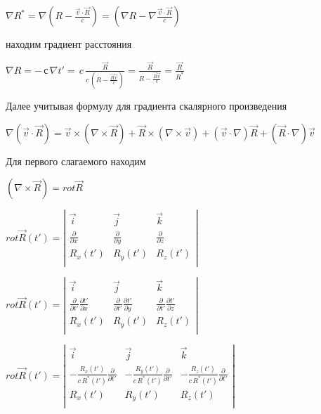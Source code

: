 \documentclass[11pt]{article}
\begin{document}
\(\nabla {{R}^{*}} = \nabla {\left( R-\frac{\overrightarrow{v}\cdot \overrightarrow{R}}{c} \right)} = {\left( \nabla R-\nabla \frac{\overrightarrow{v}\cdot \overrightarrow{R}}{c} \right)}\)

    находим градиент расстояния

\(\nabla R = -\,с \,\nabla t' = \,c\,\frac{\vec R}{c\,\left(R -\frac{\vec R\vec v}{c}\right)} = \frac{\vec R}{R -\frac{\vec R\vec v}{c}}=\frac{\vec R}{{R}^{*}}\)

    Далее учитывая формулу для градиента скалярного произведения

\(\nabla \left(\overrightarrow{v}\cdot \overrightarrow{R}\right)  = \overrightarrow{v} \times \left(\nabla \times \overrightarrow{R}\right)  + \overrightarrow{R} \times \left(\nabla \times \overrightarrow{v}\right)  + \left(\overrightarrow{v} \cdot \nabla\right) \overrightarrow{R}  + \left(\overrightarrow{R} \cdot \nabla\right) \overrightarrow{v}\)

Для первого слагаемого находим

    \(\left(\nabla \times \overrightarrow{R}\right) = rot \overrightarrow{R}\)

    \(rot \overrightarrow{R}\left(t'\right)=\left|\begin{array}{ccc}  \vec i & \vec j & \vec k\\  \frac{\partial}{\partial x} & \frac{\partial}{\partial y} & \frac{\partial}{\partial z}\\  R_{x}\left(t'\right) & R_{y}\left(t'\right) & R_{z}\left(t'\right)\\ \end{array}\right|\)

    \(rot \overrightarrow{R}\left(t'\right)=\left|\begin{array}{ccc}  \vec i & \vec j & \vec k\\  \frac{\partial}{\partial t'}\frac{\partial t'}{\partial x} & \frac{\partial}{\partial t'}\frac{\partial t'}{\partial y} & \frac{\partial}{\partial t'}\frac{\partial t'}{\partial z}\\  R_{x}\left(t'\right) & R_{y}\left(t'\right) & R_{z}\left(t'\right)\\ \end{array}\right|\)

    \(rot \overrightarrow{R}\left(t'\right)=\left|\begin{array}{ccc}  \vec i & \vec j & \vec k \\  -\frac{R_x\left(t'\right)}{c\,{{R}^{*}}\left(t'\right)}\frac{\partial}{\partial t'}  & -\frac{R_y\left(t'\right)}{c\,{{R}^{*}}\left(t'\right)}\frac{\partial}{\partial t'}  & -\frac{R_z\left(t'\right)}{c\,{{R}^{*}}\left(t'\right)}\frac{\partial}{\partial t'} \\  R_{x}\left(t'\right) & R_{y}\left(t'\right) & R_{z}\left(t'\right)\\ \end{array}\right|\)
\end{document}

